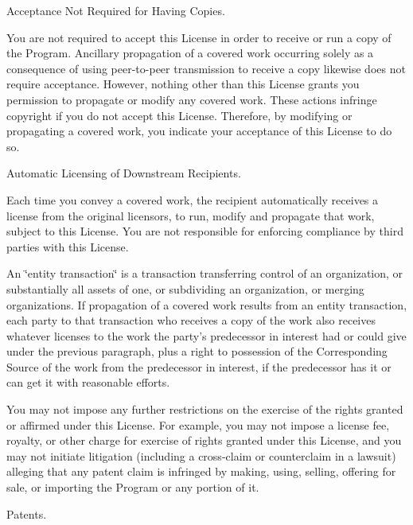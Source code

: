 \begin{DoxyEnumerate}
\item Acceptance Not Required for Having Copies.
\end{DoxyEnumerate}

You are not required to accept this License in order to receive or run a copy of the Program. Ancillary propagation of a covered work occurring solely as a consequence of using peer-\/to-\/peer transmission to receive a copy likewise does not require acceptance. However, nothing other than this License grants you permission to propagate or modify any covered work. These actions infringe copyright if you do not accept this License. Therefore, by modifying or propagating a covered work, you indicate your acceptance of this License to do so.


\begin{DoxyEnumerate}
\item Automatic Licensing of Downstream Recipients.
\end{DoxyEnumerate}

Each time you convey a covered work, the recipient automatically receives a license from the original licensors, to run, modify and propagate that work, subject to this License. You are not responsible for enforcing compliance by third parties with this License.

An \char`\"{}entity transaction\char`\"{} is a transaction transferring control of an organization, or substantially all assets of one, or subdividing an organization, or merging organizations. If propagation of a covered work results from an entity transaction, each party to that transaction who receives a copy of the work also receives whatever licenses to the work the party's predecessor in interest had or could give under the previous paragraph, plus a right to possession of the Corresponding Source of the work from the predecessor in interest, if the predecessor has it or can get it with reasonable efforts.

You may not impose any further restrictions on the exercise of the rights granted or affirmed under this License. For example, you may not impose a license fee, royalty, or other charge for exercise of rights granted under this License, and you may not initiate litigation (including a cross-\/claim or counterclaim in a lawsuit) alleging that any patent claim is infringed by making, using, selling, offering for sale, or importing the Program or any portion of it.


\begin{DoxyEnumerate}
\item Patents.
\end{DoxyEnumerate}

